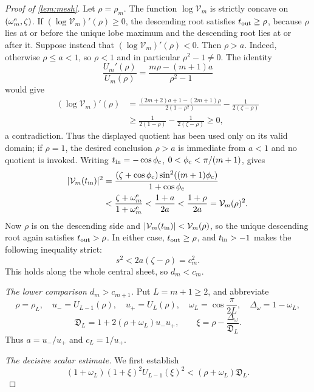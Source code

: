 \documentclass[review,hidelinks,onefignum,onetabnum]{siamart251216}
\begin{document}
\begin{proof}[Proof of \cref{lem:mesh}]
Let \(\rho=\rho_m\).  The function \(\log\mathcal V_m\) is strictly
concave on \((\omega_m^{\rm e},\zeta)\).  If
\((\log\mathcal V_m)'(\rho)\geq0\), the descending root
satisfies \(t_{\rm out}\geq\rho\), because \(\rho\) lies at or before the unique
lobe maximum and the descending root lies at or after it.  Suppose instead that
\((\log\mathcal V_m)'(\rho)<0\).  Then \(\rho>a\).  Indeed, otherwise
\(\rho\leq a<1\), so \(\rho<1\) and in particular \(\rho^2-1\neq0\).  The
identity
\[
 \frac{U_m'(\rho)}{U_m(\rho)}
 =\frac{m\rho-(m+1)a}{\rho^2-1}
\]
would give
\[
\begin{aligned}
 (\log\mathcal V_m)'(\rho)
 &=\frac{(2m+2)a+1-(2m+1)\rho}{2(1-\rho^2)}
   -\frac1{2(\zeta-\rho)}\\
 &\geq\frac1{2(1-\rho)}-\frac1{2(\zeta-\rho)}\geq0,
\end{aligned}
\]
a contradiction.  Thus the displayed quotient has been used only on its
valid domain; if \(\rho=1\), the desired conclusion \(\rho>a\) is immediate
from \(a<1\) and no quotient is invoked.
Writing \(t_{\rm in}=-\cos\phi_{\rm c}\),
\(0<\phi_{\rm c}<\pi/(m+1)\), gives
\[
\begin{aligned}
 |\mathcal V_m(t_{\rm in})|^2
 &=\frac{(\zeta+\cos\phi_{\rm c})
          \sin^2((m+1)\phi_{\rm c})}{1+\cos\phi_{\rm c}}\\
 &<\frac{\zeta+\omega_m^{\rm e}}{1+\omega_m^{\rm e}}
 <\frac{1+a}{2a}<\frac{1+\rho}{2a}=\mathcal V_m(\rho)^2.
\end{aligned}
\]
Now \(\rho\) is on the descending side and
\(|\mathcal V_m(t_{\rm in})|<\mathcal V_m(\rho)\), so the
unique descending root again satisfies \(t_{\rm out}>\rho\).  In either case,
\(t_{\rm out}\geq\rho\), and \(t_{\rm in}>-1\) makes the following
inequality strict:
\[
 s^2<2a(\zeta-\rho)=c_m^2.
\]
This holds along the whole central sheet, so \(d_m<c_m\).

\medskip\noindent\emph{The lower comparison \(d_m>c_{m+1}\).}\quad
Put \(L=m+1\geq2\), and abbreviate
\[
 \rho=\rho_L,\quad u_-=U_{L-1}(\rho),\quad u_+=U_L(\rho),\quad
 \omega_L=\cos\frac{\pi}{2L},\quad \Delta_\omega=1-\omega_L,
\]
\begin{equation}\label{eq:central-D-xi}
 \mathfrak D_L=1+2(\rho+\omega_L)u_-u_+,\qquad
 \xi=\rho-\frac{\Delta_\omega}{\mathfrak D_L}.
\end{equation}
Thus \(a=u_-/u_+\) and \(c_L=1/u_+\).

\medskip\noindent\emph{The decisive scalar estimate.}\quad
We first establish
\begin{equation}\label{eq:central-target}
 (1+\omega_L)(1+\xi)^2U_{L-1}(\xi)^2
 <(\rho+\omega_L)\mathfrak D_L.
\end{equation}


\end{proof}
\end{document}
